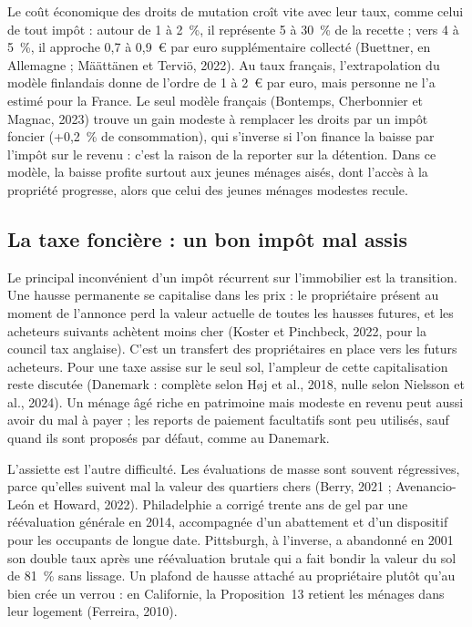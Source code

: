 \documentclass[11pt,a4paper]{article}
\begin{document}
Le coût économique des droits de mutation croît vite avec leur taux, comme celui de tout impôt : autour de
1 à 2~\%, il représente 5 à 30~\% de la recette ; vers 4 à 5~\%, il approche 0,7 à 0,9~€ par euro
supplémentaire collecté (Buettner, en Allemagne ; Määttänen et Terviö, 2022). Au taux français, l'extrapolation
du modèle finlandais donne de l'ordre de 1 à 2~€ par euro, mais personne ne l'a estimé pour la France. Le seul
modèle français (Bontemps, Cherbonnier et Magnac, 2023) trouve un gain modeste à remplacer les droits par
un impôt foncier (+0,2~\% de consommation), qui s'inverse si l'on finance la baisse par l'impôt sur le
revenu : c'est la raison de la reporter sur la détention. Dans ce modèle, la baisse profite surtout aux
jeunes ménages aisés, dont l'accès à la propriété progresse, alors que celui des jeunes ménages modestes
recule.

\subsection*{La taxe foncière : un bon impôt mal assis}

Le principal inconvénient d'un impôt récurrent sur l'immobilier est la transition. Une hausse permanente se
capitalise dans les prix : le propriétaire présent au moment de l'annonce perd la valeur actuelle de toutes
les hausses futures, et les acheteurs suivants achètent moins cher (Koster et Pinchbeck, 2022, pour la
council tax anglaise). C'est un transfert des propriétaires en place vers les futurs acheteurs. Pour une
taxe assise sur le seul sol, l'ampleur de cette capitalisation reste discutée (Danemark : complète selon
Høj et al., 2018, nulle selon Nielsson et al., 2024). Un ménage âgé riche en patrimoine mais modeste en
revenu peut aussi avoir du mal à payer ; les reports de paiement facultatifs sont peu utilisés, sauf quand
ils sont proposés par défaut, comme au Danemark.

L'assiette est l'autre difficulté. Les évaluations de masse sont souvent régressives, parce qu'elles suivent
mal la valeur des quartiers chers (Berry, 2021 ; Avenancio-León et Howard, 2022). Philadelphie a corrigé
trente ans de gel par une réévaluation générale en 2014, accompagnée d'un abattement et d'un dispositif
pour les occupants de longue date. Pittsburgh, à l'inverse, a abandonné en 2001 son double taux après une
réévaluation brutale qui a fait bondir la valeur du sol de 81~\% sans lissage. Un plafond de hausse attaché
au propriétaire plutôt qu'au bien crée un verrou : en Californie, la Proposition~13 retient les ménages dans
leur logement (Ferreira, 2010).
\end{document}
